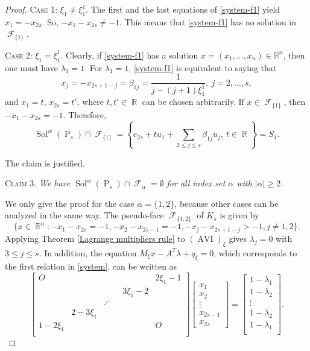 \documentclass[smallextended,envcountsect]{svjour3}       %
\DeclareMathOperator{\Sol}{Sol}
\DeclareMathOperator{\AVI}{AVI}
\DeclareMathOperator{\Pa}{P}
\DeclareMathOperator{\R}{\mathbb{R}}
\DeclareMathOperator{\F}{\mathcal{F}}
\begin{document}
\begin{proof}
\smallskip
\noindent \textsc{Case 1:} $\xi_1 \neq \xi_1^1$. The first and the last equations  of \eqref{system-f1} yield $x_{1}=-x_{2s}$. So, $-x_1-x_{2s}\neq-1$. This means that \eqref{system-f1} has no solution in $\F_{\{1\}}$. 

\smallskip
\noindent \textsc{Case 2:} $\xi_1=\xi_1^1$. Clearly, if \eqref{system-f1} has a solution $x=(x_1,...,x_n)\in\mathbb R^n$, then one must have $\lambda_1=1$. For $\lambda_1=1$, \eqref{system-f1} is equivalent to saying that
	$$x_j=-x_{2s+1-j}=\beta_{1j}=\dfrac{1}{j-(j+1)\xi_1^1},  \ j=2,...,s,$$ and  $x_1=t,\, x_{2s}=t'$, where $t,t'\in \R$ can be chosen arbitrarily.
	If $x\in\F_{\{1\}}$, then $-x_1-x_{2s}=-1$. Therefore, 
	$$\Sol^w(\Pa_s)\cap \F_{\{1\}}=\left\lbrace e_{2s}+ tu_1+\sum_{2\leq j \leq s}\beta_{1j}u_j, \ t\in \R\right\rbrace=S_1.$$

The claim is justified.

\smallskip
\noindent \textsc{Claim 3.} \textit{We have $\Sol^w(\Pa_s)\cap \F_{\alpha}=\emptyset$ for all index set $\alpha$ with $|\alpha|\geq 2$.}
\smallskip

We only give the proof for the case $\alpha=\{1,2\}$, because other cases can be analyzed in the same way. The pseudo-face $\F_{\{1,2\}}$ of $K_s$ is given by
	$$\{x\in \R^n:-x_1-x_{2s}= -1,-x_2-x_{2s-1}= -1,-x_j -x_{2s+1-j}> -1, j\neq 1,2\}.$$
Applying Theorem \ref{Lagrange multipliers rule} to $(\AVI)_\xi$ gives $\lambda_j =0$ with $3 \leq j\leq s$. In addition, the equation $M_{\xi}x-A^T\lambda+q_{\xi} =0$, which corresponds to the first relation in \eqref{system}, can be written as
\begin{equation}\label{system-f2}
	\begin{bmatrix}
O&  &  &&  & 2\xi_1-1\\ 
&   & & 	  & 3\xi_1-2 &	\\ 
&    &\iddots  & &  &	\\ 
&  2-3\xi_1& &&   &\\ 
1-2\xi_1& &&& &  O\\ 
\end{bmatrix}\begin{bmatrix}
x_1 \\ 
x_2 \\ 
\vdots\\
x_{2s-1}\\
x_{2s}
\end{bmatrix}=\begin{bmatrix}
1-\lambda_1\\
1-\lambda_2 \\ 
\vdots\\
	1-\lambda_2 \\ 
	1-\lambda_1\\
	\end{bmatrix}. 
	\end{equation}


\end{proof}
\end{document}

